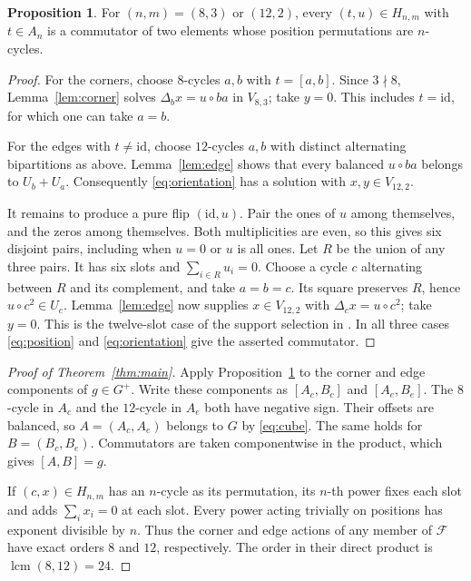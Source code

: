 \documentclass[11pt,letterpaper]{article}
\theoremstyle{definition}
\newtheorem{proposition}[theorem]{Proposition}
\theoremstyle{remark}
\newcommand{\id}{\mathrm{id}}
\newcommand{\FC}{\mathcal F}
\newcommand{\cl}[2]{[#1,#2]}
\begin{document}
\begin{proposition}\label{prop:oneorbit}
For \((n,m)=(8,3)\) or \((12,2)\), every \((t,u)\in H_{n,m}\) with
\(t\in A_n\) is a commutator of two elements whose position permutations
are \(n\)-cycles.
\end{proposition}
\begin{proof}
For the corners, choose \(8\)-cycles \(a,b\) with \(t=\cl{a}{b}\).
Since \(3\nmid8\), Lemma~\ref{lem:corner} solves
\(\Delta_b x=u\circ ba\) in \(V_{8,3}\); take \(y=0\).
This includes \(t=\id\), for which one can take \(a=b\).

For the edges with \(t\ne\id\), choose \(12\)-cycles \(a,b\) with
distinct alternating bipartitions as above. Lemma~\ref{lem:edge} shows
that every balanced \(u\circ ba\) belongs to \(U_b+U_a\).
Consequently \eqref{eq:orientation} has a solution with \(x,y\in V_{12,2}\).

It remains to produce a pure flip \((\id,u)\). Pair the ones of \(u\)
among themselves, and the zeros among themselves. Both multiplicities
are even, so this gives six disjoint pairs, including when \(u=0\) or
\(u\) is all ones. Let \(R\) be the union of any three pairs. It has six
slots and \(\sum_{i\in R}u_i=0\). Choose a cycle \(c\) alternating between
\(R\) and its complement, and take \(a=b=c\). Its square preserves
\(R\), hence \(u\circ c^2\in U_c\). Lemma~\ref{lem:edge} now supplies
\(x\in V_{12,2}\) with \(\Delta_c x=u\circ c^2\); take \(y=0\).
This is the twelve-slot case of the support selection in
\cite[Lemma~6.6]{bbw}. In all three cases \eqref{eq:position}
and \eqref{eq:orientation} give the asserted commutator.
\end{proof}

\begin{proof}[Proof of Theorem~\ref{thm:main}]
Apply Proposition~\ref{prop:oneorbit} to the corner and edge components
of \(g\in G^+\). Write these components as \(\cl{A_c}{B_c}\) and
\(\cl{A_e}{B_e}\). The \(8\)-cycle in \(A_c\) and the \(12\)-cycle in
\(A_e\) both have negative sign. Their offsets are balanced, so
\(A=(A_c,A_e)\) belongs to \(G\) by \eqref{eq:cube}. The same holds for
\(B=(B_c,B_e)\). Commutators are taken componentwise in the product,
which gives \(\cl{A}{B}=g\).

If \((c,x)\in H_{n,m}\) has an \(n\)-cycle as its permutation, its
\(n\)-th power fixes each slot and adds \(\sum_i x_i=0\) at each slot.
Every power acting trivially on positions has exponent divisible by \(n\).
Thus the corner and edge actions of any member of \(\FC\) have exact
orders \(8\) and \(12\), respectively. The order in their direct product
is \(\operatorname{lcm}(8,12)=24\).
\end{proof}
\end{document}
